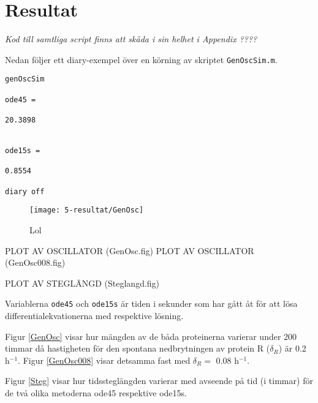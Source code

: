 \section{Resultat}

\emph{Kod till samtliga script finns att skåda i sin helhet i Appendix ????}

Nedan följer ett diary-exempel över en körning av skriptet \texttt{GenOscSim.m}.

\begin{verbatim}
genOscSim

ode45 =

20.3898


ode15s =

0.8554

diary off
\end{verbatim}

\begin{figure}
\centering
\texttt{[image: 5-resultat/GenOsc]}
\caption{Lol}
\end{figure}
PLOT AV OSCILLATOR (GenOsc.fig) \label{GenOsc}
PLOT AV OSCILLATOR (GenOsc008.fig) \label{GenOsc008}

PLOT AV STEGLÄNGD (Steglangd.fig) \label{Steg}

Variablerna \texttt{ode45} och \texttt{ode15s} är tiden i sekunder som har gått åt för att lösa differentialekvationerna med respektive lösning.

Figur \ref{GenOsc} visar hur mängden av de båda proteinerna varierar under 200 timmar då hastigheten för den spontana nedbrytningen av protein R ($\delta_R$) är 0.2 h$^{-1}$. Figur \ref{GenOsc008} visar detsamma fast med $\delta_R =$ 0.08 h$^{-1}$.

Figur \ref{Steg} visar hur tidssteglängden varierar med avseende på tid (i timmar) för de två olika metoderna ode45 respektive ode15s.